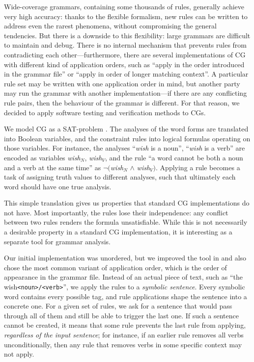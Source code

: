 Wide-coverage grammars, containing some thousands of rules, 
generally achieve very high accuracy: 
thanks to the flexible formalism, new rules can be written 
to address even the rarest phenomena, without compromising the general tendencies.
But there is a downside to this flexibility: large grammars are difficult to maintain
and debug. There is no internal mechanism that prevents rules from contradicting 
each other---furthermore, there are several implementations of CG with different kind of application orders,
such as ``apply in the order introduced in the grammar file'' or ``apply in order of longer matching context''.
A particular rule set may be written with one application order in mind, but another party may 
run the grammar with another implementation---if there are any conflicting rule pairs, then the behaviour of the grammar is different.
For that reason, we decided to apply software testing and verification methods to CGs.


We model CG as a SAT-problem \cite{listenmaa_claessen2015}.
The analyses of the word forms are translated into Boolean variables, 
and the constraint rules into logical formulas operating on those variables.
For instance, the analyses ``\emph{wish} is a noun'', ``\emph{wish} is a verb'' 
are encoded as variables \emph{wish}$_{N}$, \emph{wish}$_{V}$,  
and the rule ``a word cannot be both a noun and a verb at the same time'' as 
$\neg($\emph{wish}$_{N}$ $\land$  \emph{wish}$_{V})$.
Applying a rule becomes a task of assigning truth values to different analyses,
such that ultimately each word should have one true analysis.

This simple translation gives us properties that standard CG implementations do not have.
Most importantly, the rules lose their independence: any conflict between two rules renders the formula unsatisfiable. 
While this is not necessarily a desirable property in a standard CG implementation, it is interesting as a separate tool for grammar analysis. 

Our initial implementation \cite{listenmaa_claessen2015} was unordered, but we improved the tool in \cite{listenmaa_claessen2016} and also chose the most common variant of application order, which is the order of appearance in the grammar file.
Instead of an actual piece of text, such as 
``the\texttt{} wish\texttt{\small <noun>/<verb>}'', we apply the rules to a {\em symbolic sentence}. 
Every symbolic word contains every possible tag, and rule applications shape the sentence into a concrete one.
For a given set of rules, we ask for a sentence that would pass through all of them and still be able to trigger the last one. 
If such a sentence cannot be created, it means that some rule prevents the last rule from applying, \emph{regardless of the input sentence}; for instance, if an earlier rule removes all verbs unconditionally, then any rule that removes verbs in some specific context may not apply. 


